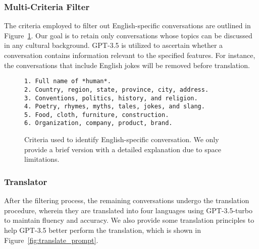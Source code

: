 \documentclass[11pt]{article}
\begin{document}
\subsubsection{Multi-Criteria Filter}

The criteria employed to filter out English-specific conversations are outlined in Figure~\ref{fig:filter_prompt}. Our goal is to retain only conversations whose topics can be discussed in any cultural background.
GPT-3.5 is utilized to ascertain whether a conversation contains information relevant to the specified features.
For instance, the conversations that include English jokes will be removed before translation.

\begin{figure}[h]
\begin{tcolorbox}[colback=blue!2,colframe=blue!50!black]
\small
\texttt{1. Full name of *human*.\\
2. Country, region, state, province, city, address.\\
3. Conventions, politics, history, and religion.\\
4. Poetry, rhymes, myths, tales, jokes, and slang.\\
5. Food, cloth, furniture, construction.\\
6. Organization, company, product, brand.}
\end{tcolorbox}
\caption{Criteria used to identify English-specific conversation. We only provide a brief version with a detailed explanation due to space limitations.}
\label{fig:filter_prompt}
\end{figure}

\subsubsection{Translator}

After the filtering process, the remaining conversations undergo the translation procedure, wherein they are translated into four languages using GPT-3.5-turbo to maintain fluency and accuracy. We also provide some translation principles to help GPT-3.5 better perform the translation, which is shown in Figure~\ref{fig:translate_prompt}.
\end{document}
